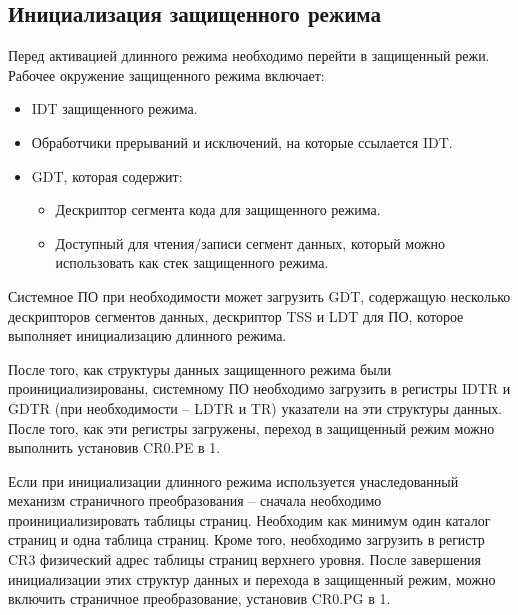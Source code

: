 \subsection{Инициализация защищенного режима}
Перед активацией длинного режима необходимо перейти в защищенный режи.
Рабочее окружение защищенного режима включает:
\begin{itemize}
\item IDT защищенного режима.
\item Обработчики прерываний и исключений, на которые ссылается IDT.
\item GDT, которая содержит:
	\begin{itemize}
	\item Дескриптор сегмента кода для защищенного режима.
	\item Доступный для чтения/записи сегмент данных, который можно использовать как стек защищенного режима.
	\end{itemize}
\end{itemize}

Системное ПО при необходимости может загрузить GDT, содержащую несколько дескрипторов сегментов данных,
дескриптор TSS и LDT для ПО, которое выполняет инициализацию длинного режима.

После того, как структуры данных защищенного режима были проинициализированы, системному ПО необходимо
загрузить в регистры IDTR и GDTR (при необходимости -- LDTR и TR) указатели на эти структуры данных.
После того, как эти регистры загружены, переход в защищенный режим можно выполнить установив CR0.PE в 1.

Если при инициализации длинного режима используется унаследованный механизм страничного преобразования --
сначала необходимо проинициализировать таблицы страниц. Необходим как минимум один каталог страниц и одна
таблица страниц. Кроме того, необходимо загрузить в регистр CR3 физический адрес таблицы страниц верхнего
уровня. После завершения инициализации этих структур данных и перехода в защищенный режим, можно
включить страничное преобразование, установив CR0.PG в 1.

